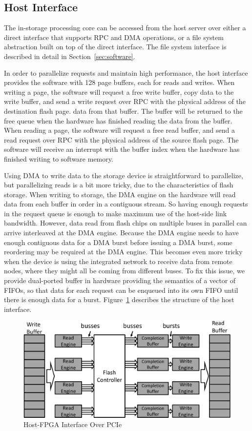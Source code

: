 \subsection{Host Interface}

The in-storage processing core can be accessed from the host server over either
a direct interface that supports RPC and DMA operations, or a file system
abstraction built on top of the direct interface. The file system interface is
described in detail in Section~\ref{sec:software}.

In order to parallelize requests and maintain high performance, the host
interface provides the software with 128 page buffers, each for reads and
writes. When writing a page, the software will request a free write buffer, copy
data to the write buffer, and send a write request over RPC with the
physical address of the destination flash page.
data from that buffer. The buffer will be returned to the free queue when the
hardware has finished reading the data from the buffer. When reading a page, the
software will request a free read buffer, and send a read request over RPC with
the physical address of the source flash page. The software will receive an
interrupt with the buffer index when the hardware has finished writing to
software memory.

Using DMA to write data to the storage device is straightforward to parallelize,
but parallelizing reads is a bit more tricky, due to the characteristics of flash
storage. When writing to storage, the DMA engine on the hardware will read data
from each buffer in order in a contiguous stream. So having enough requests in
the request queue is enough to make maximum use of the host-side link bandwidth.
However, data read from flash chips on multiple buses in parallel can arrive
interleaved at the DMA engine. Because the DMA engine needs to have enough
contiguous data for a DMA burst before issuing a DMA burst, some reordering may
be required at the DMA engine. This becomes even more tricky when the device is
using the integrated network to receive data from remote nodes, where they might
all be coming from different buses. To fix this issue, we provide dual-ported
buffer in hardware providing the semantics of a vector of FIFOs, so that data
for each request can be enqueued into its own FIFO until there is enough data
for a burst.
Figure~\ref{fig:hostinterface} describes the structure of the host
interface.

\begin{figure}[ht!]
	\centering
	\includegraphics[width=0.4	\textwidth]{figures/hostinterface-crop.pdf}
	\caption{Host-FPGA Interface Over PCIe}
	\label{fig:hostinterface}
\end{figure}


